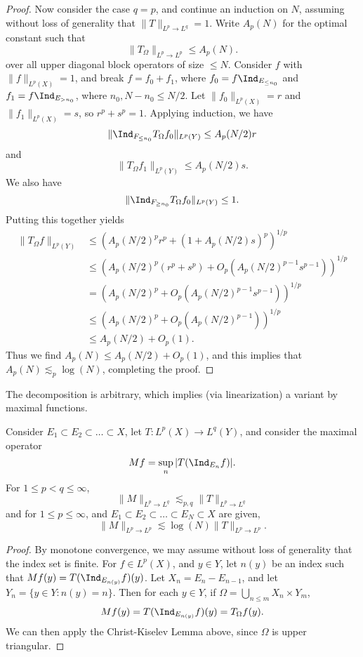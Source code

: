 \begin{proof}
    Now consider the case $q = p$, and continue an induction on $N$, assuming without loss of generality that $\| T \|_{L^p \to L^q} = 1$. Write $A_p(N)$ for the optimal constant such that
    \[ \| T_\Omega \|_{L^p \to L^p} \leq A_p(N). \]
    over all upper diagonal block operators of size $\leq N$. Consider $f$ with $\| f \|_{L^p(X)} = 1$, and break $f = f_0 + f_1$, where $f_0 = f \Ind_{E_{\leq n_0}}$ and $f_1 = f \Ind_{E_{> n_0}}$, where $n_0, N - n_0 \leq N/2$. Let $\| f_0 \|_{L^p(X)} = r$ and $\| f_1 \|_{L^p(X)} = s$, so $r^p + s^p = 1$. Applying induction, we have
    \[ \| \Ind_{F_{\leq n_0}} T_\Omega f_0 \|_{L^p(Y)} \leq A_p(N/2) r \]
    and
    \[ \| T_\Omega f_1 \|_{L^p(Y)} \leq A_p(N/2) s. \]
    We also have
    \[ \| \Ind_{F_{\geq n_0}} T_\Omega f_0 \|_{L^p(Y)} \leq 1. \]
    Putting this together yields
    \begin{align*}
        \| T_\Omega f \|_{L^p(Y)} &\leq ( A_p(N/2)^p r^p + (1 + A_p(N/2) s)^p  )^{1/p}\\
        &\leq ( A_p(N/2)^p (r^p + s^p) + O_p(A_p(N/2)^{p-1} s^{p-1}) )^{1/p}\\
        &= ( A_p(N/2)^p + O_p(A_p(N/2)^{p-1} s^{p-1}) )^{1/p}\\
        &\leq ( A_p(N/2)^p + O_p(A_p(N/2)^{p-1}) )^{1/p}\\
        &\leq A_p(N/2) + O_p(1).
    \end{align*}
    Thus we find $A_p(N) \leq A_p(N/2) + O_p(1)$, and this implies that $A_p(N) \lesssim_p \log(N)$, completing the proof.
\end{proof}

The decomposition is arbitrary, which implies (via linearization) a variant by maximal functions.

\begin{theorem}
    Consider $E_1 \subset E_2 \subset \dots \subset X$, let $T: L^p(X) \to L^q(Y)$, and consider the maximal operator
    \[ Mf = \sup_n | T(\Ind_{E_n} f) |. \]
    For $1 \leq p < q \leq \infty$,
    \[ \| M \|_{L^p \to L^q} \lesssim_{p,q} \| T \|_{L^p \to L^q} \]
    and for $1 \leq p \leq \infty$, and $E_1 \subset E_2 \subset \dots \subset E_N \subset X$ are given,
    \[ \| M \|_{L^p \to L^p} \lesssim \log(N) \| T \|_{L^p \to L^p}. \]
\end{theorem}
\begin{proof}
    By monotone convergence, we may assume without loss of generality that the index set is finite. For $f \in L^p(X)$, and $y \in Y$, let $n(y)$ be an index such that $Mf(y) = T(\Ind_{E_{n(y)}} f)(y)$. Let $X_n = E_n - E_{n-1}$, and let $Y_n = \{ y \in Y: n(y) = n \}$. Then for each $y \in Y$, if $\Omega = \bigcup_{n \leq m} X_n \times Y_m$,
    \[ Mf(y) = T(\Ind_{E_{n(y)}} f)(y) = T_\Omega f(y). \]
    We can then apply the Christ-Kiselev Lemma above, since $\Omega$ is upper triangular.
\end{proof}

